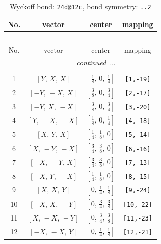 \documentclass[fleqn,8pt]{jsarticle}
\begin{document}
\begin{longtable}{cccc}
\caption{Wyckoff bond: {\tt 24d@12c}, bond symmetry: {\tt ..2}}
 \\
 \hline \hline
No. & vector & center & mapping \\ \hline \endfirsthead

\multicolumn{3}{l}{\tablename\ \thetable{}} \\
 \hline \hline
No. & vector & center & mapping \\ \hline \endhead

 \hline \hline
\multicolumn{3}{r}{\footnotesize\it continued ...} \\ \endfoot

 \hline \hline
\multicolumn{3}{r}{} \\ \endlastfoot

1 & $\left[ Y,\, X,\, X \right]$ & $\left[ \frac{1}{8},\, 0,\, \frac{1}{4} \right]$ & {\tt [1,-19]} \\ \hline
2 & $\left[ - Y,\, - X,\, X \right]$ & $\left[ \frac{3}{8},\, 0,\, \frac{3}{4} \right]$ & {\tt [2,-17]} \\ \hline
3 & $\left[ - Y,\, X,\, - X \right]$ & $\left[ \frac{3}{8},\, 0,\, \frac{3}{4} \right]$ & {\tt [3,-20]} \\ \hline
4 & $\left[ Y,\, - X,\, - X \right]$ & $\left[ \frac{1}{8},\, 0,\, \frac{1}{4} \right]$ & {\tt [4,-18]} \\ \hline
5 & $\left[ X,\, Y,\, X \right]$ & $\left[ \frac{1}{4},\, \frac{1}{8},\, 0 \right]$ & {\tt [5,-14]} \\ \hline
6 & $\left[ X,\, - Y,\, - X \right]$ & $\left[ \frac{3}{4},\, \frac{3}{8},\, 0 \right]$ & {\tt [6,-16]} \\ \hline
7 & $\left[ - X,\, - Y,\, X \right]$ & $\left[ \frac{3}{4},\, \frac{3}{8},\, 0 \right]$ & {\tt [7,-13]} \\ \hline
8 & $\left[ - X,\, Y,\, - X \right]$ & $\left[ \frac{1}{4},\, \frac{1}{8},\, 0 \right]$ & {\tt [8,-15]} \\ \hline
9 & $\left[ X,\, X,\, Y \right]$ & $\left[ 0,\, \frac{1}{4},\, \frac{1}{8} \right]$ & {\tt [9,-24]} \\ \hline
10 & $\left[ - X,\, X,\, - Y \right]$ & $\left[ 0,\, \frac{3}{4},\, \frac{3}{8} \right]$ & {\tt [10,-22]} \\ \hline
11 & $\left[ X,\, - X,\, - Y \right]$ & $\left[ 0,\, \frac{3}{4},\, \frac{3}{8} \right]$ & {\tt [11,-23]} \\ \hline
12 & $\left[ - X,\, - X,\, Y \right]$ & $\left[ 0,\, \frac{1}{4},\, \frac{1}{8} \right]$ & {\tt [12,-21]} \\
\end{longtable}
\end{document}
